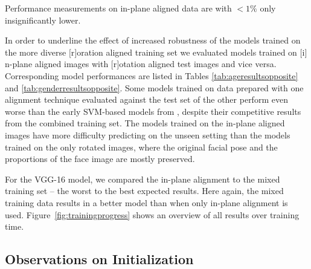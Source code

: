 \documentclass[10pt,twocolumn,letterpaper]{article}
\begin{document}
Performance measurements on in-plane aligned data are with $<1\%$ only insignificantly lower.


In order to underline the effect of increased robustness of the models trained on the more diverse $[$r$]$oration aligned training set we evaluated models trained on $[$i$]$n-plane aligned images with $[$r$]$otation aligned test images and vice versa. Corresponding model performances are listed in Tables \ref{tab:ageresultsopposite} and \ref{tab:genderresultsopposite}.
Some models trained on data prepared with one alignment technique evaluated against the test set of the other perform even worse than the early SVM-based models from \cite{eidinger2014age}, despite their competitive results from the combined training set.  
The models trained on the
in-plane aligned images have more difficulty predicting on the unseen setting than the models trained on the only rotated images, where the original facial pose and the proportions of the face image are mostly preserved.

For the VGG-16 model, we compared the in-plane alignment to the mixed training set -- the worst to the best expected results. Here again, the mixed training data results in a better model than when only in-plane alignment is used.
Figure~\ref{fig:trainingprogress} shows an overview of all results over training time.

\subsection{Observations on Initialization}
\end{document}
